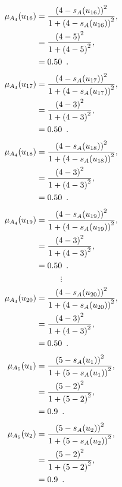 \documentclass[a4paper,openany]{book}
\begin{document}
				\begin{align}
					\mu_{A_4}(u_{16}) &= \frac{\left(4-s_A(u_{16})\right)^2}{1 + \left(4-s_A(u_{16})\right)^2} ,\\
					&= \frac{\left(4-5\right)^2}{1 + \left(4-5\right)^2} \notag ,\\
					&= 0.50 \enspace. \notag
				\end{align}
				\begin{align}
					\mu_{A_4}(u_{17}) &= \frac{\left(4-s_A(u_{17})\right)^2}{1 + \left(4-s_A(u_{17})\right)^2} ,\\
					&= \frac{\left(4-3\right)^2}{1 + \left(4-3\right)^2} \notag ,\\
					&= 0.50 \enspace. \notag
				\end{align}
				\begin{align}
					\mu_{A_4}(u_{18}) &= \frac{\left(4-s_A(u_{18})\right)^2}{1 + \left(4-s_A(u_{18})\right)^2} ,\\
					&= \frac{\left(4-3\right)^2}{1 + \left(4-3\right)^2} \notag ,\\
					&= 0.50 \enspace. \notag
				\end{align}
				\begin{align}
					\mu_{A_4}(u_{19}) &= \frac{\left(4-s_A(u_{19})\right)^2}{1 + \left(4-s_A(u_{19})\right)^2} ,\\
					&= \frac{\left(4-3\right)^2}{1 + \left(4-3\right)^2} \notag ,\\
					&= 0.50 \enspace. \notag
				\end{align}
				\[
					\vdots
				\]
				\begin{align}
					\mu_{A_4}(u_{20}) &= \frac{\left(4-s_A(u_{20})\right)^2}{1 + \left(4-s_A(u_{20})\right)^2} ,\\
					&= \frac{\left(4-3\right)^2}{1 + \left(4-3\right)^2} \notag ,\\
					&= 0.50 \enspace. \notag
				\end{align}
				\begin{align}
					\mu_{A_5}(u_1) &= \frac{\left(5-s_A(u_1)\right)^2}{1 + \left(5-s_A(u_1)\right)^2} ,\\
					&= \frac{\left(5-2\right)^2}{1 + \left(5-2\right)^2} \notag ,\\
					&= 0.9 \enspace. \notag
				\end{align}
				\begin{align}
					\mu_{A_5}(u_2) &= \frac{\left(5-s_A(u_2)\right)^2}{1 + \left(5-s_A(u_2)\right)^2} ,\\
					&= \frac{\left(5-2\right)^2}{1 + \left(5-2\right)^2} \notag ,\\
					&= 0.9 \enspace. \notag
				\end{align}
\end{document}
